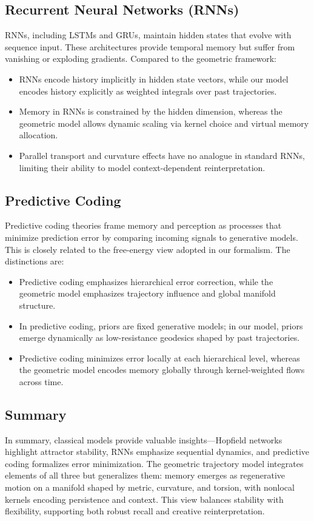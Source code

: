 \documentclass[a4paper,12pt]{article}
\begin{document}
\subsection*{Recurrent Neural Networks (RNNs)}
RNNs, including LSTMs and GRUs, maintain hidden states that evolve with 
sequence input. These architectures provide temporal memory but suffer from 
vanishing or exploding gradients. Compared to the geometric framework:
\begin{itemize}
    \item RNNs encode history implicitly in hidden state vectors, while our 
    model encodes history explicitly as weighted integrals over past 
    trajectories.
    \item Memory in RNNs is constrained by the hidden dimension, whereas the 
    geometric model allows dynamic scaling via kernel choice and virtual 
    memory allocation.
    \item Parallel transport and curvature effects have no analogue in standard 
    RNNs, limiting their ability to model context-dependent reinterpretation.
\end{itemize}

\subsection*{Predictive Coding}
Predictive coding theories frame memory and perception as processes that 
minimize prediction error by comparing incoming signals to generative models. 
This is closely related to the free-energy view adopted in our formalism. 
The distinctions are:
\begin{itemize}
    \item Predictive coding emphasizes hierarchical error correction, while 
    the geometric model emphasizes trajectory influence and global manifold 
    structure.
    \item In predictive coding, priors are fixed generative models; in our 
    model, priors emerge dynamically as low-resistance geodesics shaped by 
    past trajectories.
    \item Predictive coding minimizes error locally at each hierarchical 
    level, whereas the geometric model encodes memory globally through 
    kernel-weighted flows across time.
\end{itemize}

\subsection*{Summary}
In summary, classical models provide valuable insights—Hopfield networks 
highlight attractor stability, RNNs emphasize sequential dynamics, and 
predictive coding formalizes error minimization. The geometric trajectory 
model integrates elements of all three but generalizes them: memory emerges 
as regenerative motion on a manifold shaped by metric, curvature, and 
torsion, with nonlocal kernels encoding persistence and context. This view 
balances stability with flexibility, supporting both robust recall and 
creative reinterpretation.


\newpage


\end{document}
